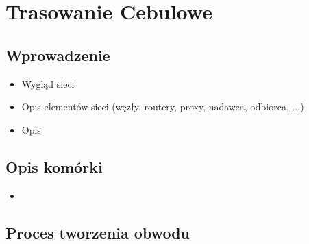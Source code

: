 \section{Trasowanie Cebulowe}\paragraph{}
\subsection{Wprowadzenie}
\begin{itemize}
 \item Wygląd sieci
 \item Opis elementów sieci (węzły, routery, proxy, nadawca, odbiorca, ...)
 \item Opis
\end{itemize}
\subsection{Opis komórki}
\begin{itemize}
 \item 
\end{itemize}

\subsection{Proces tworzenia obwodu}\paragraph{}

\subsection{}